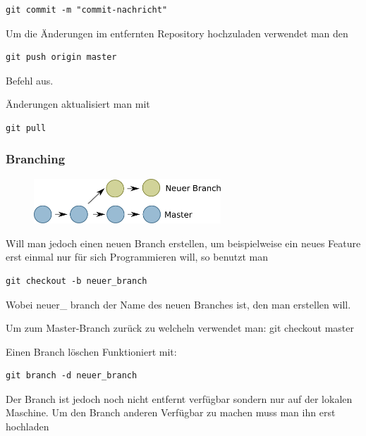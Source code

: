 \begin{verbatim}
git commit -m "commit-nachricht"
\end{verbatim}

Um die Änderungen im entfernten Repository hochzuladen verwendet man den 

\begin{verbatim}
git push origin master
\end{verbatim}

Befehl aus.

Änderungen aktualisiert man mit 

\begin{verbatim}
git pull
\end{verbatim}

\subsubsection{Branching}

\begin{figure}[htb]
\begin{center}
\includegraphics[width=7cm]{bilder/branch.pdf}
\end{center} 
\end{figure}

Will man jedoch einen neuen Branch erstellen, um beispielweise ein neues Feature erst einmal nur für sich Programmieren will, so benutzt man

\begin{verbatim}
git checkout -b neuer_branch
\end{verbatim}

Wobei neuer\_ branch der Name des neuen Branches ist, den man erstellen will.

Um zum Master-Branch zurück zu welcheln verwendet man:
git checkout master

Einen Branch löschen Funktioniert mit:

\begin{verbatim}
git branch -d neuer_branch
\end{verbatim}

Der Branch ist jedoch noch nicht entfernt verfügbar sondern nur auf der lokalen Maschine.
Um den Branch anderen Verfügbar zu machen muss man ihn erst hochladen

